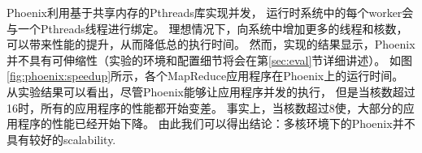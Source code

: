 Phoenix利用基于共享内存的Pthreads库实现并发，
运行时系统中的每个worker会与一个Pthreads线程进行绑定。
理想情况下，向系统中增加更多的线程和核数，可以带来性能的提升，从而降低总的执行时间。
然而，实现的结果显示，Phoenix并不具有可伸缩性（实验的环境和配置细节将会在第\ref{sec:eval}节详细讲述）。
如图\ref{fig:phoenix:speedup}所示，各个MapReduce应用程序在Phoenix上的运行时间。
从实验结果可以看出，尽管Phoenix能够让应用程序并发的执行，
但是当核数超过16时，所有的应用程序的性能都开始变差。
事实上，当核数超过8使，大部分的应用程序的性能已经开始下降。
由此我们可以得出结论：多核环境下的Phoenix并不具有较好的scalability.


